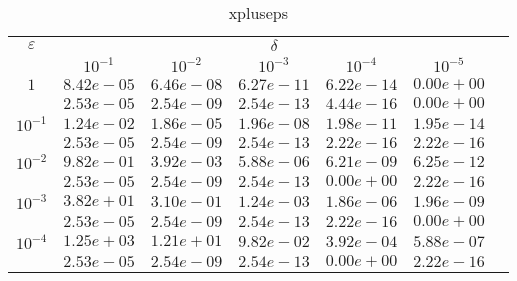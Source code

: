 \documentclass[10pt,twoside]{uz_kgu}
\begin{document}
\begin{table} [!htb]
	\caption {xpluseps}
	\begin{center}
		\begin{tabular}{|c|c|c|c|c|c|c}
			\cline{1-6} $\varepsilon$ & \multicolumn{5}{c|}{$\delta$} \\
			\cline{2-6} &$10^{-1}$ & $10^{-2}$ & $10^{-3}$  & $10^{-4}$& $10^{-5}$\\
			\cline{1-6}
			$1$
			&$8.42e-05$&$6.46e-08$&$6.27e-11$&$6.22e-14$& $0.00e+00$\\
			&$2.53e-05$&$2.54e-09$&$2.54e-13$&$4.44e-16$& $0.00e+00$\\
			\cline{1-6}
			$10^{-1}$
			&$1.24e-02$&$1.86e-05$&$1.96e-08$&$1.98e-11$&$1.95e-14$\\
			&$2.53e-05$&$2.54e-09$&$2.54e-13$&$2.22e-16$&$2.22e-16$\\
			\cline{1-6}
			$10^{-2}$
			&$9.82e-01$&$3.92e-03$&$5.88e-06$&$6.21e-09$&$6.25e-12$\\
			&$2.53e-05$&$2.54e-09$&$2.54e-13$&$0.00e+00$&$2.22e-16$\\
			\cline{1-6}
			$10^{-3}$
			&$3.82e+01$&$3.10e-01$&$1.24e-03$&$1.86e-06$&$1.96e-09$\\
			&$2.53e-05$&$2.54e-09$&$2.54e-13$&$2.22e-16$&$0.00e+00$\\
			\cline{1-6}
			$10^{-4}$
			&$1.25e+03$&$1.21e+01$&$9.82e-02$&$3.92e-04$&$5.88e-07$\\
			&$2.53e-05$&$2.54e-09$&$2.54e-13$&$0.00e+00$&$2.22e-16$\\
			\cline{1-6}
		\end{tabular}
	\end{center}
\end{table}
\end{document}
